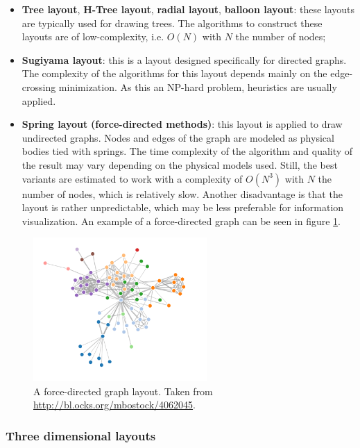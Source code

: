 \begin{itemize}
	\item \textbf{Tree layout}, \textbf{H-Tree layout}, \textbf{radial layout}, \textbf{balloon layout}: these layouts are typically used for drawing trees. The algorithms to construct these layouts are of low-complexity, i.e. $O(N)$ with $N$ the number of nodes;
	\item \textbf{Sugiyama layout}: this is a layout designed specifically for directed graphs. The complexity of the algorithms for this layout depends mainly on the edge-crossing minimization. As this an NP-hard problem, heuristics are usually applied.
	\item \textbf{Spring layout} \textbf{(force-directed methods)}: this layout is applied to draw undirected graphs. Nodes and edges of the graph are modeled as physical bodies tied with springs. The time complexity of the algorithm and quality of the result may vary depending on the physical models used. Still, the best variants are estimated to work with a complexity of $O(N^{3})$ with $N$ the number of nodes, which is relatively slow. Another disadvantage is that the layout is rather unpredictable, which may be less preferable for information visualization. An example of a force-directed graph can be seen in figure \ref{figure:forcedirected_layout}.
\end{itemize}

\begin{figure}%
	\begin{center}
		\includegraphics[width=250px]{img/force-directed_graph}%
	\end{center}
\caption{A force-directed graph layout. Taken from \url{http://bl.ocks.org/mbostock/4062045}.}%
\label{figure:forcedirected_layout}%
\end{figure}


\subsubsection{Three dimensional layouts}\label{chapter:literature_study:section:interaction:subsection:graphs:subsubsection:threed}


